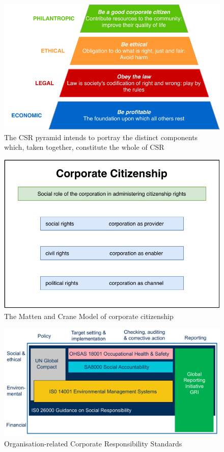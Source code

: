 \documentclass[11pt]{article}
\theoremstyle{definition}
\begin{document}
\begin{figure}[htb]
	\centering
	\includegraphics[width=0.7\linewidth]{img/caroll_pyramid_corporate_responsibility.pdf}
	\caption{The CSR pyramid intends to portray the distinct components which, taken together, constitute the whole of CSR \parencite{caroll1991pyramid}}
\end{figure}

\begin{figure}[htb]
	\centering
	\includegraphics[width=0.7\linewidth]{img/Matten_Crane_corporate_citizenship.pdf}
	\caption{The Matten and Crane Model of corporate citizenship}
\end{figure}

\begin{figure}[htb]
	\centering
	\includegraphics[width=0.8\linewidth]{img/corporate_responsibility_standards}
	\caption{Organisation-related Corporate Responsibility Standards}
	\label{fig:corporateresponsibilitystandards}
\end{figure}
\end{document}
